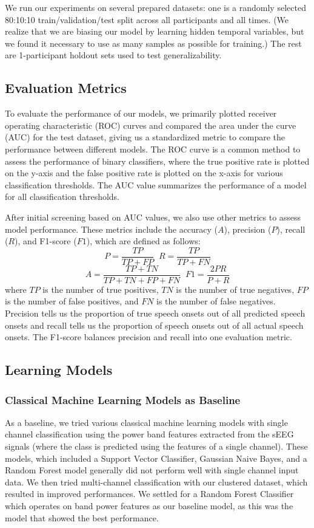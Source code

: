 \documentclass[format=sigconf, nonacm=true, review=false, screen=true]{acmart}
\begin{document}
We run our experiments on several prepared datasets: one is a randomly selected 80:10:10 train/validation/test split across all participants and all times. (We realize that we are biasing our model by learning hidden temporal variables, but we found it necessary to use as many samples as possible for training.) The rest are 1-participant holdout sets used to test generalizability.

\subsection{Evaluation Metrics}
To evaluate the performance of our models, we primarily plotted receiver operating characteristic (ROC) curves and compared the area under the curve (AUC) for the test dataset, giving us a standardized metric to compare the performance between different models. The ROC curve is a common method to assess the performance of binary classifiers, where the true positive rate is plotted on the y-axis and the false positive rate is plotted on the x-axis for various classification thresholds. The AUC value summarizes the performance of a model for all classification thresholds. 

After initial screening based on AUC values, we also use other metrics to assess model performance. These metrics include the accuracy ($A$), precision ($P$), recall ($R$), and F1-score ($F1$), which are defined as follows:
\[P=\frac{TP}{TP+FP} \;\; R=\frac{TP}{TP+FN}\]
\[A=\frac{TP+TN}{TP+TN+FP+FN} \;\; F1=\frac{2PR}{P+R}\]
where $TP$ is the number of true positives, $TN$ is the number of true negatives, $FP$ is the number of false positives, and $FN$ is the number of false negatives. Precision tells us the proportion of true speech onsets out of all predicted speech onsets and recall tells us the proportion of speech onsets out of all actual speech onsets. The F1-score balances precision and recall into one evaluation metric.

\subsection{Learning Models}

\subsubsection{Classical Machine Learning Models as Baseline}
As a baseline, we tried various classical machine learning models with single channel classification using the power band features extracted from the sEEG signals (where the class is predicted using the features of a single channel). These models, which included a Support Vector Classifier, Gaussian Naive Bayes, and a Random Forest model generally did not perform well with single channel input data. We then tried multi-channel classification with our clustered dataset, which resulted in improved performances. We settled for a Random Forest Classifier which operates on band power features as our baseline model, as this was the model that showed the best performance.
\end{document}
